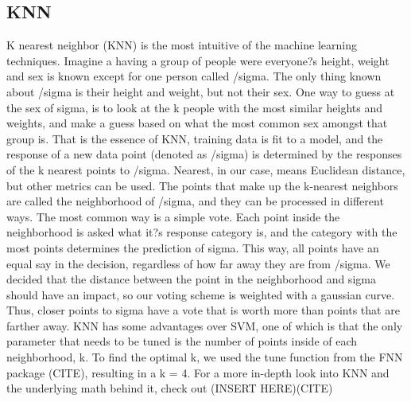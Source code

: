 \documentclass[11pt, oneside]{article}   	%
\begin{document}
\subsection{KNN}
K nearest neighbor (KNN) is the most intuitive of the machine learning techniques. Imagine a having a group of people were everyone?s height, weight and sex is known except for one person called /sigma. The only thing known about /sigma is their height and weight, but not their sex. One way to guess at the sex of sigma, is to look at the k people with the most similar heights and weights, and make a guess based on what the most common sex amongst that group is. That is the essence of KNN, training data is fit to a model, and the response of a new data point (denoted as /sigma) is determined by the responses of the k nearest points to /sigma. Nearest, in our case, means Euclidean distance, but other metrics can be used. The points that make up the k-nearest neighbors are called the neighborhood of /sigma, and they can be processed in different ways. The most common way is a simple vote. Each point inside the neighborhood is asked what it?s response category is, and the category with the most points determines the prediction of sigma. This way, all points have an equal say in the decision, regardless of how far away they are from /sigma. We decided that the distance between the point in the neighborhood and sigma should have an impact, so our voting scheme is weighted with a gaussian curve. Thus, closer points to sigma have a vote that is worth more than points that are farther away. KNN has some advantages over SVM, one of which is that the only parameter that needs to be tuned is the number of points inside of each neighborhood, k. To find the optimal k, we used the tune function from the FNN package (CITE), resulting in a k = 4. For a more in-depth look into KNN and the underlying math behind it, check out (INSERT HERE)(CITE)
\end{document}
